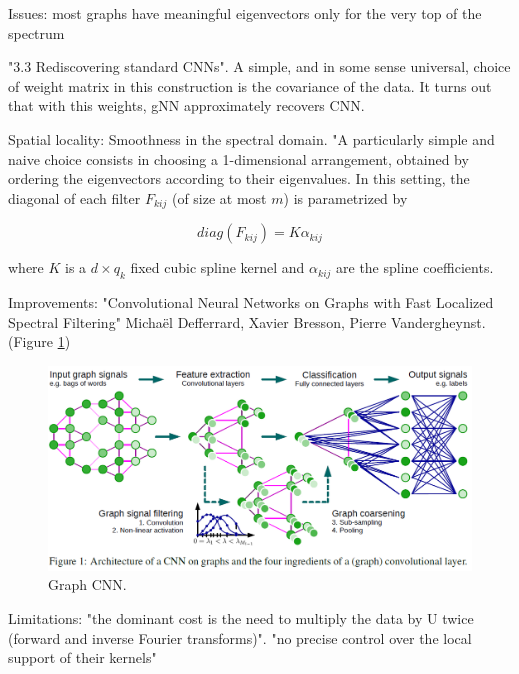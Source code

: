 \documentclass[english]{article}
\begin{document}
\item Issues:  most graphs have meaningful eigenvectors only for
the very top of the spectrum
\eitem 

\item "3.3 Rediscovering standard CNNs". A simple, and in some sense universal, choice of weight matrix in this construction is the covariance
of the data. It turns out that with this weights, gNN approximately recovers CNN.


\item Spatial locality: Smoothness in the spectral domain. "A particularly simple and naive choice consists in choosing a 1-dimensional arrangement, obtained
by ordering the eigenvectors according to their eigenvalues.  In this setting, the diagonal of each filter
$F_{kij}$ (of size at most $m$) is parametrized by

$$diag(F_{kij}) = K\alpha_{kij}$$

where $K$ is a $d \times q_k$ fixed cubic spline kernel and $\alpha_{kij}$ are the spline coefficients.




\eitem 

\item Improvements: "Convolutional Neural Networks on Graphs
with Fast Localized Spectral Filtering" Michaël Defferrard, Xavier Bresson, Pierre Vandergheynst. (Figure \ref{gcnn})


\begin{figure}
  \centering
  \includegraphics[scale=0.5]{gcnn.png}
    \caption{Graph CNN.}
    \label{gcnn}
\end{figure}



\benum 
\item 
Limitations: "the dominant cost is the need
to multiply the data by U twice (forward and inverse Fourier transforms)". "no precise control over the
local support of their kernels"
\end{document}
